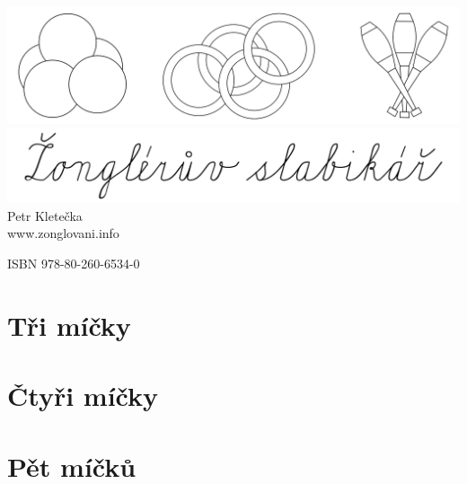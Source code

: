 \documentclass[12pt,a4paper,twoside]{book}
\begin{document}
\frontmatter
\setlength{\parindent}{0pt}

\newcommand{\nbtitlestretch}{\spaceskip0.6em}
\setlength\fboxsep{0pt}
\setlength\fboxrule{0.5pt}
\begin{titlepage}
\begin{center}
\includegraphics[width=1\textwidth]{obrazky/titleimg.png}
\\[1.5cm]
\includegraphics[width=1\textwidth]{obrazky/nadpis.png}
\\[1.5cm]
\Large Petr Kletečka
\\[10cm]
www.zonglovani.info
\end{center}
\end{titlepage}

\thispagestyle{nic}

\null
\vfill
\begin{flushright}
ISBN 978-80-260-6534-0
\end{flushright}

\cleardoublepage
\setcounter{tocdepth}{1}
\tableofcontents{}

\mainmatter
\pagestyle{fancy}
\renewcommand{\arraystretch}{1.1}
\chapter{Tři míčky}



\chapter{Čtyři míčky}



\chapter{Pět míčků}
\end{document}
